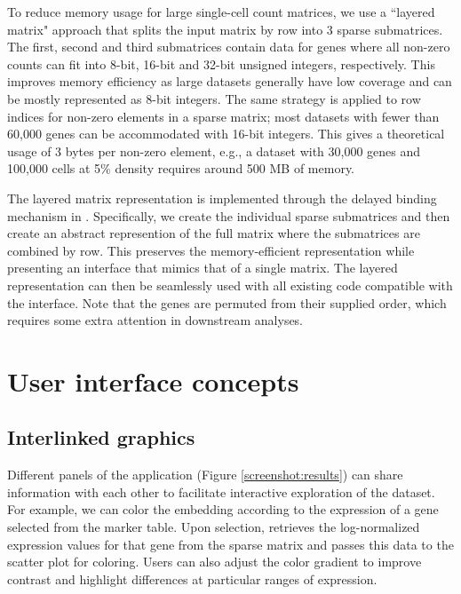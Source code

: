 \documentclass{article}
\begin{document}
To reduce memory usage for large single-cell count matrices, we use a ``layered matrix" approach that splits the input matrix by row into 3 sparse submatrices.
The first, second and third submatrices contain data for genes where all non-zero counts can fit into 8-bit, 16-bit and 32-bit unsigned integers, respectively.
This improves memory efficiency as large datasets generally have low coverage and can be mostly represented as 8-bit integers.
The same strategy is applied to row indices for non-zero elements in a sparse matrix; most datasets with fewer than 60,000 genes can be accommodated with 16-bit integers.
This gives a theoretical usage of 3 bytes per non-zero element, e.g., a dataset with 30,000 genes and 100,000 cells at 5\% density requires around 500 MB of memory.

The layered matrix representation is implemented through the delayed binding mechanism in .
Specifically, we create the individual sparse submatrices and then create an abstract represention of the full matrix where the submatrices are combined by row.
This preserves the memory-efficient representation while presenting an interface that mimics that of a single matrix.
The layered representation can then be seamlessly used with all existing code compatible with the  interface.
Note that the genes are permuted from their supplied order, which requires some extra attention in downstream analyses.


\section{User interface concepts}

\subsection{Interlinked graphics}

Different panels of the  application (Figure \ref{screenshot:results}) can share information with each other to facilitate interactive exploration of the dataset.
For example, we can color the embedding according to the expression of a gene selected from the marker table.
Upon selection,  retrieves the log-normalized expression values for that gene from the sparse matrix and passes this data to the scatter plot for coloring.
Users can also adjust the color gradient to improve contrast and highlight differences at particular ranges of expression.
\end{document}
